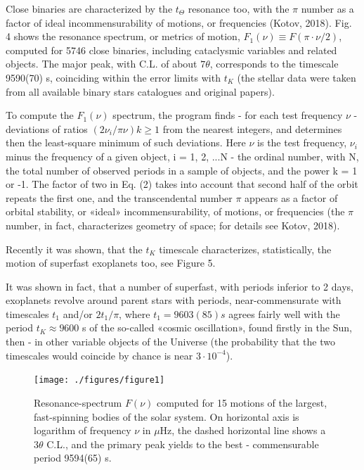 \documentclass[twoside,draft]{article}
\begin{document}
\begin{sloppypar}
{Close binaries are characterized by the $t_{\Theta}$ resonance too, with the $\pi$ number as a factor of ideal
incommensurability of motions, or frequencies (Kotov, 2018). Fig. 4 shows the resonance spectrum,
or metrics of motion, $F_{1} (\nu) \equiv F(\pi \cdot \nu/2)$, computed for 5746 close binaries, including cataclysmic
variables and related objects. The major peak, with C.L. of about $7 \theta$, corresponds to the timescale
9590(70) s, coinciding within the error limits with $t_{K}$ (the stellar data were taken from all available
binary stars catalogues and original papers).

To compute the $F_{1} (\nu)$ spectrum, the program finds - for each test frequency $\nu$ - deviations of
ratios $(2\nu_{i} /\pi \nu) k \geq 1$ from the nearest integers, and determines then the least-square minimum of such
deviations. Here $\nu$ is the test frequency, $\nu_{i}$ minus the frequency of a given object, i = 1, 2, ...N - the
ordinal number, with N, the total number of observed periods in a sample of objects, and the power
k = 1 or -1. The factor of two in Eq. (2) takes into account that second half of the orbit repeats the
first one, and the transcendental number $\pi$ appears as a factor of orbital stability, or «ideal»
incommensurability, of motions, or frequencies (the $\pi$ number, in fact, characterizes geometry of
space; for details see Kotov, 2018).

Recently it was shown, that the $t_K$ timescale characterizes, statistically, the motion of superfast
exoplanets too, see Figure 5.

It was shown in fact, that a number of superfast, with periods inferior to 2 days, exoplanets revolve
around parent stars with periods, near-commensurate with timescales $t_{1}$ and/or $2 t_{1}/\pi$, where $t_{1} =
9603(85) s$ agrees fairly well with the period $t_{K} \approx 9600$ s of the so-called «cosmic oscillation», found
firstly in the Sun, then - in other variable objects of the Universe (the probability that the two
timescales would coincide by chance is near $3 \cdot 10^{-4}$).

\begin{figure}
\centering
\texttt{[image: ./figures/figure1]}
\caption{Resonance-spectrum $F(\nu)$ computed for 15 motions of the largest, fast-spinning bodies of
the solar system. On horizontal axis is logarithm of frequency $\nu$ in $\mu$Hz, the dashed horizontal line
shows a $ 3 \theta $ C.L., and the primary peak yields to the best - commensurable period 9594(65) s.}
\label{fig:figure_label}
\end{figure}

}
\end{sloppypar}
\end{document}
